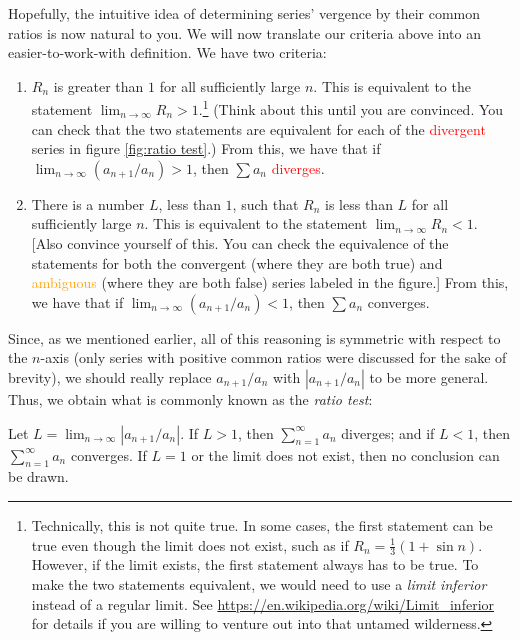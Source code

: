\documentclass{myarticle}
\theoremstyle{nospace}
\newtheorem{old series theorem}{Theorem}
\newenvironment{series theorem}{\begin{mdframed}\begin{old series theorem}}{\end{old series theorem}\end{mdframed}}
\begin{document}
Hopefully, the intuitive idea of determining series' vergence by their common ratios is now natural to you. We will now translate our criteria above into an easier-to-work-with definition. We have two criteria:
\begin{enumerate}
\item $R_n$ is greater than $1$ for all sufficiently large $n$. This is equivalent to the statement $\lim_{n \to \infty} R_n > 1$.\footnote{Technically, this is not quite true. In some cases, the first statement can be true even though the limit does not exist, such as if $R_n = \frac{1}{3}(1 + \sin n)$. However, if the limit exists, the first statement always has to be true. To make the two statements equivalent, we would need to use a \emph{limit inferior} instead of a regular limit. See \url{https://en.wikipedia.org/wiki/Limit_inferior} for details if you are willing to venture out into that untamed wilderness.} (Think about this until you are convinced. You can check that the two statements are equivalent for each of the \textcolor{red}{divergent} series in figure \ref{fig:ratio test}.) From this, we have that if $\lim_{n \to \infty} (a_{n+1}/a_n) > 1$, then $\sum a_n$ \textcolor{red}{diverges}.
\item There is a number $L$, less than $1$, such that $R_n$ is less than $L$ for all sufficiently large $n$. This is equivalent to the statement $\lim_{n \to \infty} R_n < 1$. [Also convince yourself of this. You can check the equivalence of the statements for both the \textcolor{nicegreen}{convergent} (where they are both true) and \textcolor{orange}{ambiguous} (where they are both false) series labeled in the figure.] From this, we have that if $\lim_{n \to \infty} (a_{n+1}/a_n) < 1$, then $\sum a_n$ \textcolor{nicegreen}{converges}.
\end{enumerate}

Since, as we mentioned earlier, all of this reasoning is symmetric with respect to the $n$-axis (only series with positive common ratios were discussed for the sake of brevity), we should really replace $a_{n+1}/a_n$ with $|a_{n+1}/a_n|$ to be more general. Thus, we obtain what is commonly known as the \emph{ratio test}:

\begin{series theorem} Let $L = \lim_{n \to \infty} |a_{n+1}/a_n|$. If $L > 1$, then $\sum_{n=1}^\infty a_n$ diverges; and if $L < 1$, then $\sum_{n=1}^\infty a_n$ converges. If $L = 1$ or the limit does not exist, then no conclusion can be drawn. \end{series theorem}
\end{document}
